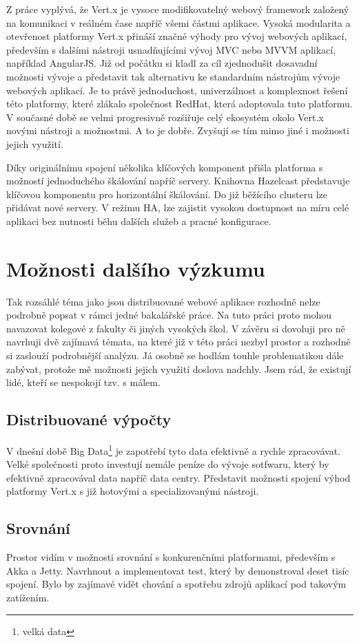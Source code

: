 Z práce vyplývá, že Vert.x je vysoce modifikovatelný webový framework založený na komunikaci v reálném čase napříč všemi částmi aplikace. Vysoká modularita a otevřenost platformy Vert.x přináší značné výhody pro vývoj webových aplikací, především s dalšími nástroji usnadňujícími vývoj MVC nebo MVVM aplikací, například AngularJS. Již od počátku si kladl za cíl zjednodušit dosavadní možnosti vývoje a představit tak alternativu ke standardním nástrojům vývoje webových aplikací. Je to právě jednoduchost, univerzálnost a komplexnost řešení této platformy, které zlákalo společnost RedHat, která adoptovala tuto platformu. V současné době se velmi progresivně rozšiřuje celý ekosystém okolo Vert.x novými nástroji a možnostmi. A to je dobře. Zvyšují se tím mimo jiné i možnosti jejich využití.

Díky originálnímu spojení několika klíčových komponent přišla platforma s možností jednoduchého škálování napříč servery. Knihovna Hazelcast představuje klíčovou komponentu pro horizontální škálování. Do již běžícího clusteru lze přidávat nové servery. V režimu HA, lze zajistit vysokou dostupnost na míru celé aplikaci bez nutnosti běhu dalších služeb a pracné konfigurace.

\section{Možnosti dalšího výzkumu}

Tak rozsáhlé téma jako jsou distribuované webové aplikace rozhodně nelze podrobně popsat v rámci jedné bakalářské práce. Na tuto práci proto mohou navazovat kolegové z fakulty či jiných vysokých škol. V závěru si dovoluji pro ně navrhuji dvě zajímavá témata, na které již v této práci nezbyl prostor a rozhodně si zaslouží podrobnější analýzu. Já osobně se hodlám touhle problematikou dále zabývat, protože mě možnosti jejich využití doslova nadchly. Jsem rád, že existují lidé, kteří se nespokojí tzv. s málem.
 
\subsection{Distribuované výpočty}

V dnešní době Big Data\footnote{velká data} je zapotřebí tyto data efektivně a rychle zpracovávat. Velké společnosti proto investují nemále peníze do vývoje sotfwaru, který by efektivně zpracovával data napříč data centry. Představit možnosti spojení výhod platformy Vert.x s již hotovými a specializovanými nástroji.

\subsection{Srovnání}

Prostor vidím v možnosti srovnání s konkurenčními platformami, především s Akka a Jetty. Navrhnout a implementovat test, který by demonstroval deset tisíc spojení. Bylo by zajímavé vidět chování a spotřebu zdrojů aplikací pod takovým zatížením.